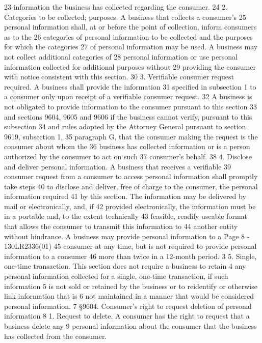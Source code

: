 23 information the business has collected regarding the consumer.
24 2. Categories to be collected; purposes. A business that collects a consumer's
25 personal information shall, at or before the point of collection, inform consumers as to the
26 categories of personal information to be collected and the purposes for which the categories
27 of personal information may be used. A business may not collect additional categories of
28 personal information or use personal information collected for additional purposes without
29 providing the consumer with notice consistent with this section.
30 3. Verifiable consumer request required. A business shall provide the information
31 specified in subsection 1 to a consumer only upon receipt of a verifiable consumer request.
32 A business is not obligated to provide information to the consumer pursuant to this section
33 and sections 9604, 9605 and 9606 if the business cannot verify, pursuant to this subsection
34 and rules adopted by the Attorney General pursuant to section 9619, subsection 1,
35 paragraph G, that the consumer making the request is the consumer about whom the
36 business has collected information or is a person authorized by the consumer to act on such
37 consumer's behalf.
38 4. Disclose and deliver personal information. A business that receives a verifiable
39 consumer request from a consumer to access personal information shall promptly take steps
40 to disclose and deliver, free of charge to the consumer, the personal information required
41 by this section. The information may be delivered by mail or electronically, and, if
42 provided electronically, the information must be in a portable and, to the extent technically
43 feasible, readily useable format that allows the consumer to transmit this information to
44 another entity without hindrance. A business may provide personal information to a 
Page 8 - 130LR2336(01)
45 consumer at any time, but is not required to provide personal information to a consumer
46 more than twice in a 12-month period.
3 5. Single, one-time transaction. This section does not require a business to retain
4 any personal information collected for a single, one-time transaction, if such information
5 is not sold or retained by the business or to reidentify or otherwise link information that is
6 not maintained in a manner that would be considered personal information.
7 §9604. Consumer's right to request deletion of personal information
8 1. Request to delete. A consumer has the right to request that a business delete any
9 personal information about the consumer that the business has collected from the consumer.
